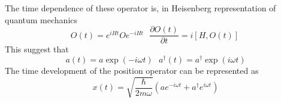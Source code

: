 The time dependence of these operator is, in Heisenberg representation of quantum mechanics
\begin{equation}
    O(t) = e^{iHt}Oe^{-iHt}~ ~ ~ \frac{\partial O(t)}{\partial t} = i \left[ H, O(t) \right] ~ \label{1.33}
\end{equation}
This suggest that
\begin{equation}
    a(t) = a \exp(-i\omega t) ~ ~ ~ a^\dagger(t) = a^\dagger \exp(i\omega t) \label{1.36}
\end{equation}
The time development of the position operator can be represented as
\begin{equation}
    x(t) = \sqrt{ \frac{\hbar}{2m\omega} } \left(a e^{-i\omega t} + a^\dagger e^{i\omega t} \right)     \label{1.37}
\end{equation}

